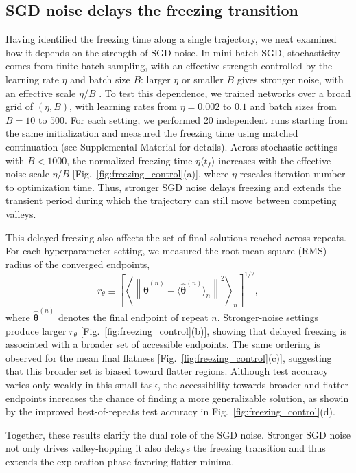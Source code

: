 \documentclass[aps,prx,reprint,superscriptaddress,longbibliography,nofootinbib,floatfix]{revtex4-2}
\begin{document}
\subsection{SGD noise delays the freezing transition}
Having identified the freezing time along a single trajectory, we next examined how it depends on the strength of SGD noise. In mini-batch SGD, stochasticity comes from finite-batch sampling, with an effective strength controlled by the learning rate $\eta$ and batch size $B$: larger $\eta$ or smaller $B$ gives stronger noise, with an effective scale $\eta/B$ \cite{jastrzebskiThreeFactorsInfluencing2018}. To test this dependence, we trained networks over a broad grid of $(\eta,B)$, with learning rates from $\eta=0.002$ to $0.1$ and batch sizes from $B=10$ to $500$. For each setting, we performed 20 independent runs starting from the same initialization and measured the freezing time using matched continuation (see Supplemental Material for details). Across stochastic settings with $B<1000$, the normalized freezing time $\eta \langle t_f \rangle$ increases with the effective noise scale $\eta/B$ [Fig.~\ref{fig:freezing_control}(a)], where $\eta$ rescales iteration number to optimization time. Thus, stronger SGD noise delays freezing and extends the transient period during which the trajectory can still move between competing valleys.

This delayed freezing also affects the set of final solutions reached across repeats. For each hyperparameter setting, we measured the root-mean-square (RMS) radius of the converged endpoints,
\begin{equation} r_\theta \equiv \left[ \left\langle \left\| \hat{\bm{\theta}}^{(n)} - \langle\hat{\bm{\theta}}^{(n)}\rangle_n \right\|^2 \right\rangle_n \right]^{1/2}, 
\end{equation}
where $\hat{\bm{\theta}}^{(n)}$ denotes the final endpoint of repeat $n$. Stronger-noise settings produce larger $r_\theta$ [Fig.~\ref{fig:freezing_control}(b)], showing that delayed freezing is associated with a broader set of accessible endpoints. The same ordering is observed for the mean final flatness [Fig.~\ref{fig:freezing_control}(c)], suggesting that this broader set is biased toward flatter regions. Although test accuracy varies only weakly in this small task, the accessibility towards broader and flatter endpoints increases the chance of finding a more generalizable solution, as showin by the improved best-of-repeats test accuracy in Fig.~\ref{fig:freezing_control}(d).

Together, these results clarify the dual role of the SGD noise. Stronger SGD noise not only drives valley-hopping it also delays the freezing transition and thus extends the exploration phase favoring flatter minima.
\end{document}
